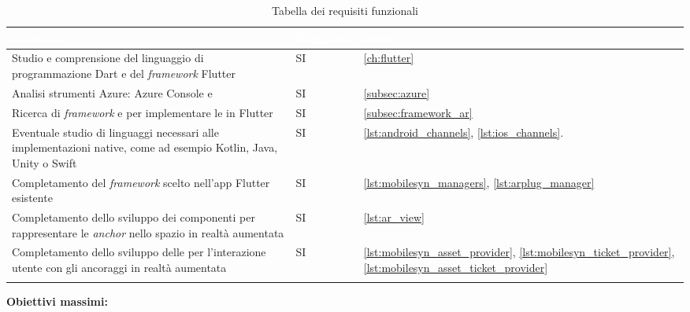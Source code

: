 {
    \setlength{\freewidth}{\dimexpr\textwidth-10\tabcolsep}
    \renewcommand{\arraystretch}{1.5}
    \centering
    \setlength{\aboverulesep}{0pt}
    \setlength{\belowrulesep}{0pt}
    \begin{longtable}{C{.8\freewidth} C{.162\freewidth} C{.115\freewidth}}
       \toprule
    \textcolor{white}{\textbf{Obiettivo}}&
    \textcolor{white}{\textbf{Raggiunto}}&
    \textcolor{white}{\textbf{Fonte}}\\
    \toprule
    \endhead
    
    Studio e comprensione del linguaggio di programmazione Dart e del \textit{framework} Flutter & SI & \ref{ch:flutter}\\
    Analisi strumenti Azure: Azure Console e \asa{}& SI & \ref{subsec:azure}\\
    Ricerca di \textit{framework} e \sdk{} per implementare le \asa{} in Flutter& SI & \ref{subsec:framework_ar}\\
    Eventuale studio di linguaggi necessari alle implementazioni native, come ad esempio Kotlin, Java, Unity o Swift & SI & \ref{lst:android_channels}, \ref{lst:ios_channels}.\\
    Completamento del \textit{framework} scelto nell'app Flutter esistente& SI &\ref{lst:mobilesyn_managers}, \ref{lst:arplug_manager} \\
    Completamento dello sviluppo dei componenti per rappresentare le \textit{anchor} nello spazio in realtà aumentata& SI & \ref{lst:ar_view}\\
    Completamento dello sviluppo delle \api{} per l'interazione utente con gli ancoraggi in realtà aumentata& SI & \ref{lst:mobilesyn_asset_provider}, \ref{lst:mobilesyn_ticket_provider}, \ref{lst:mobilesyn_asset_ticket_provider}\\

    \bottomrule
    \caption{Tabella dei requisiti funzionali}
    \end{longtable}
}

\aCapo{}
\textbf{Obiettivi massimi:}

